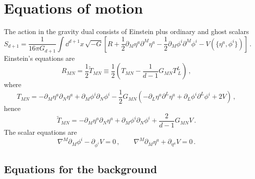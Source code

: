 \section{Equations of motion}\label{app:eoms}

The action in the gravity dual consists of Einstein plus ordinary and ghost scalars
\begin{equation}
	S_{d+1}=\frac{1}{16\pi G_{d+1}}\int \dd^{d+1} x\, \sqrt{-G}\left[R+\frac{1}{2}\partial_M \eta^a\partial^M\eta^a-\frac{1}{2}\partial_M \phi^i\partial^M\phi^i-V\left(\{\eta^a,\phi^i\}\right)\right]\,.
\end{equation}
Einstein's equations are
\begin{equation}
	R_{MN}=\frac{1}{2}\widetilde T_{MN}\equiv \frac{1}{2}\left(T_{MN}-\frac{1}{d-1}G_{MN}T^L_{\ L} \right)\,,
\end{equation}
where
\begin{equation}
	T_{MN}=-\partial_M \eta^a\partial_N\eta^a+\partial_M \phi^i\partial_N\phi^i-\frac{1}{2}G_{MN}\left( -\partial_L \eta^a\partial^L\eta^a+\partial_L \phi^i\partial^L\phi^i+2V\right)\,,
\end{equation}
hence
\begin{equation}
	\widetilde T_{MN}=-\partial_M \eta^a\partial_N\eta^a+\partial_M \phi^i\partial_N\phi^i+\frac{2}{d-1}G_{MN}V\,.
\end{equation}
The scalar equations are
\begin{equation}
	\nabla^M\partial_M\phi^i-\partial_{\phi^i}V=0
	\,,\qquad \nabla^M\partial_M\eta^a+\partial_{\eta^a}V=0\,.
\end{equation}

\subsection{Equations for the background}

